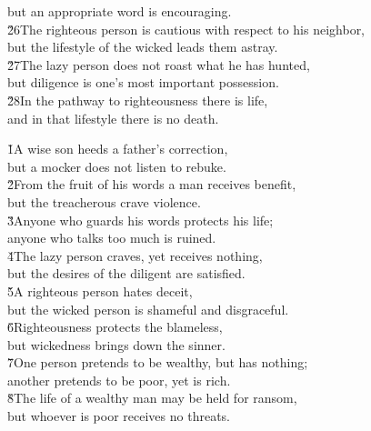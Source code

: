 \begin{poetry}
\poemll    but an appropriate word is encouraging. \\
\poeml \v{26}The righteous person is cautious with respect to his neighbor, \\
\poemll    but the lifestyle of the wicked leads them astray. \\
\poeml \v{27}The lazy person does not roast what he has hunted, \\
\poemll    but diligence is one's most important possession. \\
\poeml \v{28}In the pathway to righteousness there is life, \\
\poemll    and in that lifestyle there is no death.
\end{poetry}

\begin{poetry}
\poeml {}
\v{1}A wise son heeds a father's correction, \\
\poeml but a mocker does not listen to rebuke. \\
\poeml \v{2}From the fruit of his words a man receives benefit, \\
\poemll    but the treacherous crave violence. \\
\poeml \v{3}Anyone who guards his words protects his life; \\
\poemll    anyone who talks too much is ruined. \\
\poeml \v{4}The lazy person craves, yet receives nothing, \\
\poemll    but the desires of the diligent are satisfied. \\
\poeml \v{5}A righteous person hates deceit, \\
\poemll    but the wicked person is shameful and disgraceful. \\
\poeml \v{6}Righteousness protects the blameless, \\
\poemll    but wickedness brings down the sinner. \\
\poeml \v{7}One person pretends to be wealthy, but has nothing; \\
\poemll    another pretends to be poor, yet is rich. \\
\poeml \v{8}The life of a wealthy man may be held for ransom, \\
\poemll    but whoever is poor receives no threats. \\

\end{poetry}
